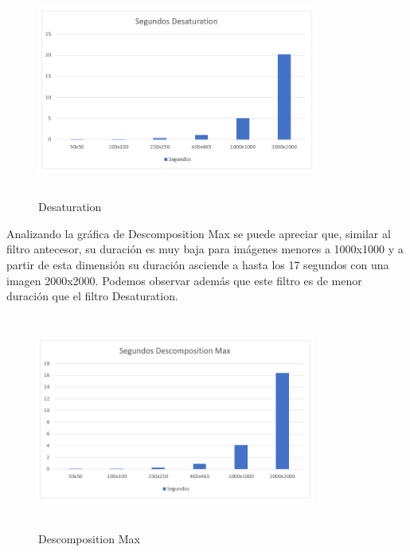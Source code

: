 \documentclass[journal]{IEEEtran}
\begin{document}
\begin{itemize}
\newpage
	\begin{figure}[h]
		\centering
		\includegraphics[height= 200pt, width=260pt]{msd.png}
		\caption{Desaturation}
	\end{figure}

	Analizando la gráfica de Descomposition Max se puede apreciar que, similar al filtro antecesor, su duración es muy baja para imágenes menores a 1000x1000 y a partir de esta dimensión su duración asciende a hasta los 17 segundos con una imagen 2000x2000. Podemos observar además que este filtro es de menor duración que el filtro Desaturation. 

	\begin{figure}[h]
		\centering
		\includegraphics[height= 200pt, width=260pt]{msdm.png}
		\caption{Descomposition Max}
	\end{figure}


\end{itemize}
\end{document}
